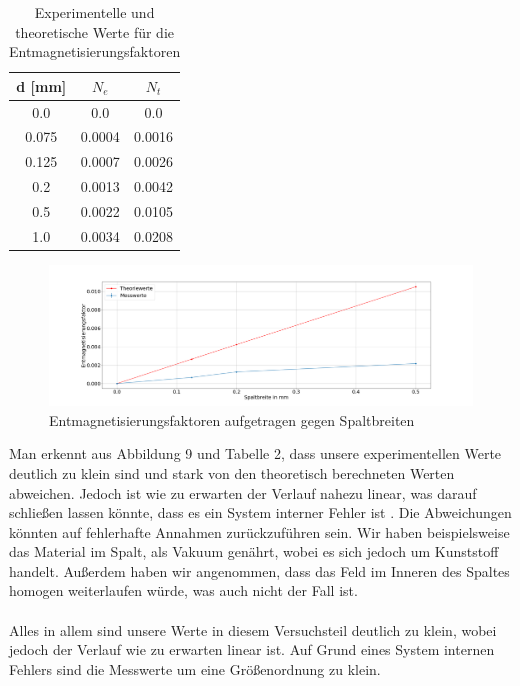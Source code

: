             \begin{table}[H]
                \centering
                \begin{tabular}[]{c|c|c}
                    d [mm] & $N_e$ & $N_t$\\
                    \hline
                    0.0     & 0.0       & 0.0   \\
                    0.075   & 0.0004    & 0.0016\\
                    0.125   & 0.0007    & 0.0026\\
                    0.2     & 0.0013    & 0.0042\\
                    0.5     & 0.0022    & 0.0105\\
                    1.0     & 0.0034    & 0.0208\\
                \end{tabular}
                \caption{Experimentelle und theoretische Werte für die Entmagnetisierungsfaktoren}
            \end{table}
            \begin{figure}[H]
                \centering
                \includegraphics[width=0.8 \textwidth]{Images/Teil4.2_Entmagnetisierungsfakoren.png}
                \caption{Entmagnetisierungsfaktoren aufgetragen gegen Spaltbreiten}
            \end{figure}
            Man erkennt aus Abbildung 9 und Tabelle 2, dass unsere experimentellen Werte deutlich zu klein sind und
            stark von den theoretisch berechneten Werten abweichen. Jedoch ist wie zu erwarten der Verlauf 
            nahezu linear, was darauf schließen lassen könnte, dass es ein System interner Fehler ist %
            .
            Die Abweichungen könnten auf fehlerhafte Annahmen zurückzuführen sein. Wir haben beispielsweise das Material im Spalt,
            als Vakuum genährt, wobei es sich jedoch um Kunststoff handelt. Außerdem haben wir angenommen, dass das Feld 
            im Inneren des Spaltes homogen weiterlaufen würde, was auch nicht der Fall ist.\\
            \\

            Alles in allem sind unsere Werte in diesem Versuchsteil deutlich zu klein, wobei jedoch
            der Verlauf wie zu erwarten linear ist. Auf Grund eines System internen Fehlers %
             sind die Messwerte
            um eine Größenordnung zu klein. 
